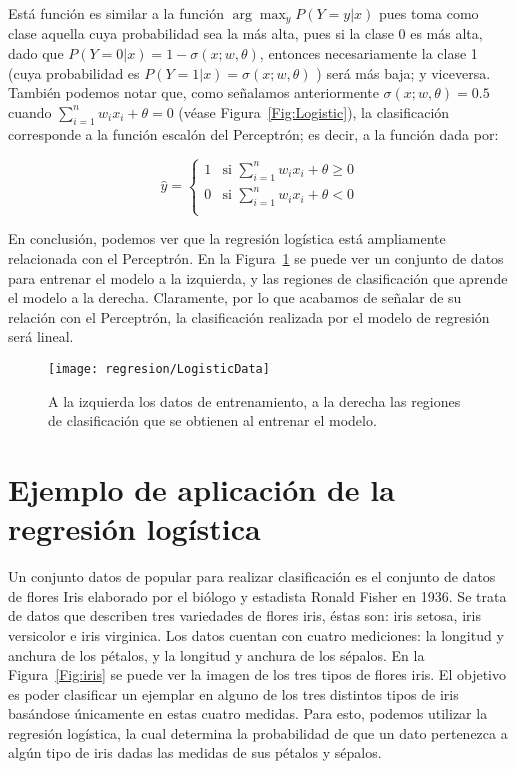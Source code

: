 Está función es similar a la función $\arg\max_y P(Y=y|x)$ pues toma como clase aquella cuya probabilidad sea la más alta, pues si la clase 0 es más alta, dado que $P(Y=0|x) = 1-\sigma(x; w, \theta)$, entonces necesariamente la clase 1 (cuya probabilidad es $P(Y=1|x) = \sigma(x; w, \theta)$ ) será más baja; y viceversa. También podemos notar que, como señalamos anteriormente $\sigma(x; w, \theta) = 0.5$ cuando $\sum_{i=1}^n w_i x_i + \theta = 0$ (véase Figura~\ref{Fig:Logistic}), la clasificación corresponde a la función escalón del Perceptrón; es decir, a la función dada por:

\begin{equation*}
    \hat{y} = \begin{cases} 1 & \text{si } \sum_{i=1}^n w_i x_i + \theta \geq 0 \\
        0 & \text{si } \sum_{i=1}^n w_i x_i + \theta < 0 \\
    \end{cases}
\end{equation*}

En conclusión, podemos ver que la regresión logística está ampliamente relacionada con el Perceptrón. En la Figura~\ref{Fig:LogistData} se puede ver un conjunto de datos para entrenar el modelo a la izquierda, y las regiones de clasificación que aprende el modelo a la derecha. Claramente, por lo que acabamos de señalar de su relación con el Perceptrón, la clasificación realizada por el modelo de regresión será lineal.

\begin{figure}
 \centering
 \texttt{[image: regresion/LogisticData]}
 \caption{A la izquierda los datos de entrenamiento, a la derecha las regiones de clasificación que se obtienen al entrenar el modelo.}\label{Fig:LogistData}
\end{figure}


\section{Ejemplo de aplicación de la regresión logística}

Un conjunto datos de popular para realizar clasificación es el conjunto de datos de flores Iris elaborado por el biólogo y estadista Ronald Fisher en 1936. Se trata de datos que describen tres variedades de flores iris, éstas son: iris setosa, iris versicolor e iris virginica. Los datos cuentan con cuatro mediciones: la longitud y anchura de los pétalos, y la longitud y anchura de los sépalos. En la Figura~\ref{Fig:iris} se puede ver la imagen de los tres tipos de flores iris. El objetivo es poder clasificar un ejemplar en alguno de los tres distintos tipos de iris basándose únicamente en estas cuatro medidas. Para esto, podemos utilizar la regresión logística, la cual determina la probabilidad de que un dato pertenezca a algún tipo de iris dadas las medidas de sus pétalos y sépalos.


